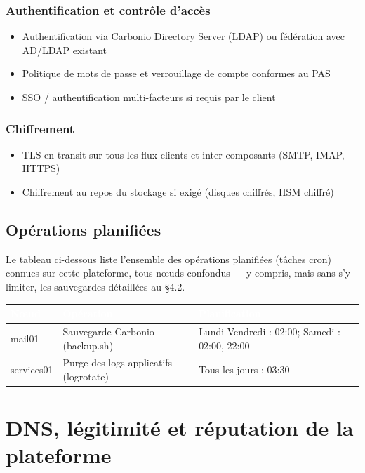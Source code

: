 \documentclass[11pt,a4paper]{report}
\newcommand{\tblhead}[1]{\textcolor{white}{\textbf{#1}}}
\begin{document}
\subsection{Authentification et contrôle d'accès}
\begin{itemize}[nosep]
  \item Authentification via Carbonio Directory Server (LDAP) ou fédération avec AD/LDAP existant
  \item Politique de mots de passe et verrouillage de compte conformes au PAS
  \item SSO / authentification multi-facteurs si requis par le client
\end{itemize}

\subsection{Chiffrement}
\begin{itemize}[nosep]
  \item TLS en transit sur tous les flux clients et inter-composants (SMTP, IMAP, HTTPS)
  \item Chiffrement au repos du stockage si exigé (disques chiffrés, HSM chiffré)
\end{itemize}

\section{Opérations planifiées}
Le tableau ci-dessous liste l'ensemble des opérations planifiées (tâches cron) connues sur cette plateforme, tous nœuds confondus --- y compris, mais sans s'y limiter, les sauvegardes détaillées au \S4.2.

\begin{longtable}{|p{2.6cm}|p{5.4cm}|p{5.2cm}|}
\hline
\rowcolor{primary}\tblhead{Nœud} & \tblhead{Opération} & \tblhead{Planification} \\
\hline
\endhead
mail01 & Sauvegarde Carbonio (backup.\allowbreak{}sh) & Lundi-\allowbreak{}Vendredi : 02:00; Samedi : 02:00, 22:00 \\
\hline
services01 & Purge des logs applicatifs (logrotate) & Tous les jours : 03:30 \\
\hline
\end{longtable}


\chapter{DNS, légitimité et réputation de la plateforme}
\end{document}
